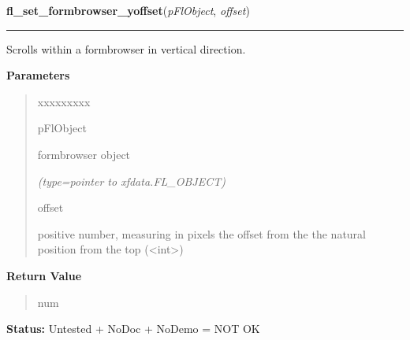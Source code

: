 \hspace{.8\funcindent}\begin{boxedminipage}{\funcwidth}

    \raggedright \textbf{fl\_set\_formbrowser\_yoffset}(\textit{pFlObject}, \textit{offset})

    \vspace{-1.5ex}

    \rule{\textwidth}{0.5\fboxrule}
\setlength{\parskip}{2ex}
    Scrolls within a formbrowser in vertical direction.

\setlength{\parskip}{1ex}
      \textbf{Parameters}
      \vspace{-1ex}

      \begin{quote}
        \begin{Ventry}{xxxxxxxxx}

          \item[pFlObject]

          formbrowser object

            {\it (type=pointer to xfdata.FL\_OBJECT)}

          \item[offset]

          positive number, measuring in pixels the offset from the the 
          natural position from the top ({\textless}int{\textgreater})

        \end{Ventry}

      \end{quote}

      \textbf{Return Value}
    \vspace{-1ex}

      \begin{quote}
      num

      \end{quote}

\textbf{Status:} Untested + NoDoc + NoDemo = NOT OK



    \end{boxedminipage}

    \label{xformslib:flformbrowser:fl_get_formbrowser_xoffset}

    \vspace{0.5ex}


